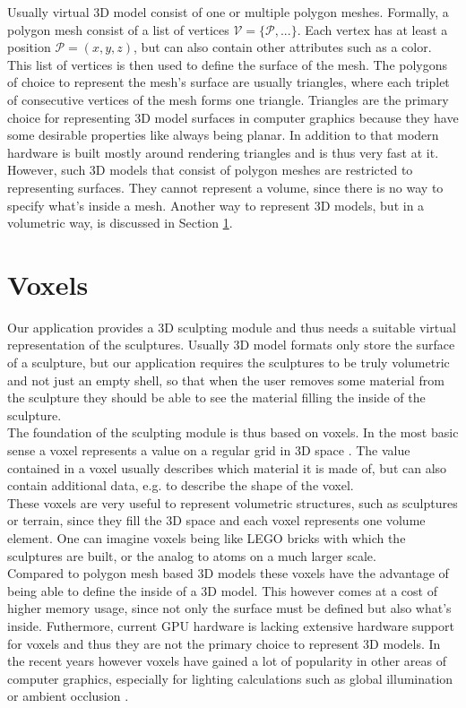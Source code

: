 Usually virtual 3D model consist of one or multiple polygon meshes. Formally, a polygon mesh consist of a list of vertices $\mathcal{V} = \{\mathcal{P}, ...\}$. Each vertex has at least a position $\mathcal{P} = (x, y, z)$, but can also contain other attributes such as a color. This list of vertices is then used to define the surface of the mesh. The polygons of choice to represent the mesh's surface are usually triangles, where each triplet of consecutive vertices of the mesh forms one triangle. Triangles are the primary choice for representing 3D model surfaces in computer graphics because they have some desirable properties like always being planar. In addition to that modern hardware is built mostly around rendering triangles and is thus very fast at it.\\
However, such 3D models that consist of polygon meshes are restricted to representing surfaces. They cannot represent a volume, since there is no way to specify what's inside a mesh. Another way to represent 3D models, but in a volumetric way, is discussed in Section \ref{sec:voxels_concept}.

\section{Voxels}
\label{sec:voxels_concept}

Our application provides a 3D sculpting module and thus needs a suitable virtual representation of the sculptures. Usually 3D model formats only store the surface of a sculpture, but our application requires the sculptures to be
truly volumetric and not just an empty shell, so that when the user removes some material from the sculpture they should be able to see the material filling the inside of the sculpture.\\
The foundation of the sculpting module is thus based on voxels. In the most basic sense a voxel represents a value on a regular grid in 3D space \cite{voxels}.
The value contained in a voxel usually describes which material it is made of, but can also contain additional data, e.g. to describe the shape of the voxel.\\
These voxels are very useful to represent volumetric structures, such as sculptures or terrain, since they fill the 3D space and each voxel represents one volume element. One can imagine voxels being like LEGO bricks with which
the sculptures are built, or the analog to atoms on a much larger scale.\\
Compared to polygon mesh based 3D models these voxels have the advantage of being able to define the inside of a 3D model. This however comes at a cost of higher memory usage, since not only the surface must be defined but also what's inside. Futhermore, current GPU hardware is lacking extensive hardware support for voxels and thus they are not the primary choice to represent 3D models. In the recent years however voxels have gained a lot of popularity in other areas of computer graphics, especially for lighting calculations such as global illumination \cite{voxel_global_illumination} or ambient occlusion \cite{voxel_ambient_occlusion}.

